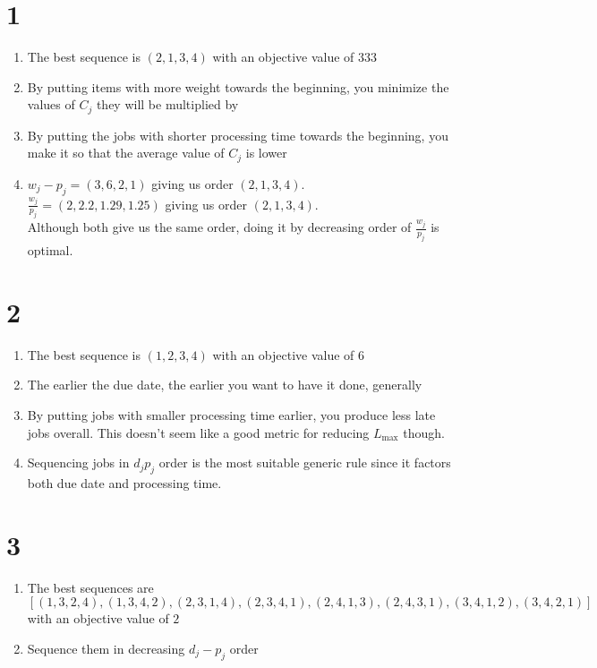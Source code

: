 \documentclass[11pt]{article}
\begin{document}
\section*{1}
    \begin{enumerate}
        \item The best sequence is $(2, 1, 3, 4)$ with an objective value of $333$
        \item By putting items with more weight towards the beginning, you minimize the values of $C_j$ they will be multiplied by
        \item By putting the jobs with shorter processing time towards the beginning, you make it so that the average value of $C_j$ is lower
        \item $w_j -p_j = (3, 6, 2, 1)$ giving us order $(2, 1, 3, 4)$. \\
            $\frac{w_j}{p_j}=(2, 2.2, 1.29, 1.25)$ giving us order $(2, 1, 3, 4)$. \\
            Although both give us the same order, doing it by decreasing order of $\frac{w_j}{p_j}$ is optimal.
    \end{enumerate}

\section*{2}
    \begin{enumerate}
        \item The best sequence is $(1, 2, 3, 4)$ with an objective value of $6$
        \item The earlier the due date, the earlier you want to have it done, generally
        \item By putting jobs with smaller processing time earlier, you produce less late jobs overall.
        This doesn't seem like a good metric for reducing $L_{\max}$ though.
        \item Sequencing jobs in $d_j p_j$ order is the most suitable generic rule since it factors both due date and processing time.
    \end{enumerate}

\section*{3}
    \begin{enumerate}
        \item The best sequences are $[(1, 3, 2, 4), (1, 3, 4, 2), (2, 3, 1, 4), (2, 3, 4, 1), (2, 4, 1, 3), (2, 4, 3, 1), (3, 4, 1, 2), (3, 4, 2, 1)]$ with an objective value of $2$
        \item Sequence them in decreasing $d_j - p_j$ order
    \end{enumerate}
\end{document}
